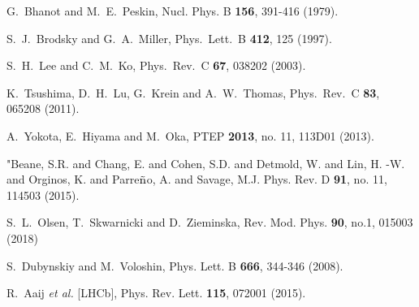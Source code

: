 \documentclass[prd,amsmath,%
twocolumn,floatfix,amssymb, preprintnumbers, nofootinbib, superscriptaddress]{revtex4}
\begin{document}
\begin{thebibliography}{99}
G.~Bhanot and M.~E.~Peskin,
Nucl. Phys. B \textbf{156}, 391-416 (1979).



  S.~J.~Brodsky and G.~A.~Miller,
  Phys.\ Lett.\ B {\bf 412}, 125 (1997).

  
  S.~H.~Lee and C.~M.~Ko,
  Phys.\ Rev.\ C {\bf 67}, 038202 (2003). 
  
  K.~Tsushima, D.~H.~Lu, G.~Krein and A.~W.~Thomas,
  Phys.\ Rev.\ C {\bf 83}, 065208 (2011). 

  
  A.~Yokota, E.~Hiyama and M.~Oka,
  PTEP {\bf 2013}, no. 11, 113D01 (2013).

  "Beane, S.R. and Chang, E. and Cohen, S.D. and Detmold, W. and Lin, H. -W. and Orginos, K. and Parre$\tilde{\rm n}$o, A. and Savage, M.J.
  Phys. Rev. D {\bf 91}, no. 11, 114503 (2015). 
  

S.~L.~Olsen, T.~Skwarnicki and D.~Zieminska,
Rev. Mod. Phys. \textbf{90}, no.1, 015003 (2018)


S.~Dubynskiy and M.~Voloshin,
Phys. Lett. B \textbf{666}, 344-346 (2008). 


R.~Aaij \textit{et al.} [LHCb],
Phys. Rev. Lett. \textbf{115}, 072001 (2015). 



\end{thebibliography}
\end{document}
